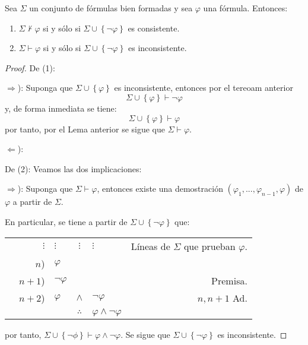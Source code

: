 \documentclass[12pt]{report}
\newcounter{it}
\theoremstyle{largebreak}
\begin{document}
    \begin{cor}
        Sea $\Sigma$ un conjunto de fórmulas bien formadas y sea $\varphi$ una fórmula. Entonces:
        \begin{enumerate}
            \item $\Sigma\nvdash\varphi$ si y sólo si $\Sigma\cup\left\{\neg\varphi\right\}$ es consistente.
            \item $\Sigma\vdash\varphi$ si y sólo si $\Sigma\cup\left\{\neg\varphi\right\}$ es inconsistente.
        \end{enumerate}
    \end{cor}

    \begin{proof}
        De (1):

        $\Rightarrow$): Suponga que $\Sigma\cup\left\{\varphi \right\}$ es inconsistente, entonces por el tereoam anterior
        \begin{equation*}
            \Sigma\cup\left\{\varphi \right\}\vdash\neg\varphi
        \end{equation*}
        y, de forma inmediata se tiene:
        \begin{equation*}
            \Sigma\cup\left\{\varphi\right\}\vdash\varphi
        \end{equation*}
        por tanto, por el Lema anterior se sigue que $\Sigma\vdash\varphi$.

        $\Leftarrow$): %

        De (2): Veamos las dos implicaciones:

        $\Rightarrow$): Suponga que $\Sigma\vdash\varphi$, entonces existe una demostración $(\varphi_1,...,\varphi_{ n-1},\varphi)$ de $\varphi$ a partir de $\Sigma$.

        En particular, se tiene a partir de $\Sigma\cup\left\{\neg\varphi\right\}$ que:
        \begin{center}
            \begin{tabular}{l r l c l r}
                & $\vdots$ & $\vdots$ & $\vdots$ & $\vdots$ & Líneas de $\Sigma$ que prueban $\varphi$. \\
                & $n$) & $\varphi$ &  &  & \\
                & $n+1$) & $\neg\varphi$ &  &  & Premisa. \\
                & $n+2$) & $\varphi$ & $\land$ & $\neg\varphi$ & $n,n+1$ Ad. \\
                \hline
                & & & $\therefore$ & $\varphi\land\neg\varphi$ & \\
            \end{tabular}
        \end{center}
        por tanto, $\Sigma\cup\left\{\neg\phi\right\}\vdash\varphi\land\neg\varphi$. Se sigue que $\Sigma\cup\left\{\neg\varphi\right\}$ es inconsistente.


\end{proof}
\end{document}
